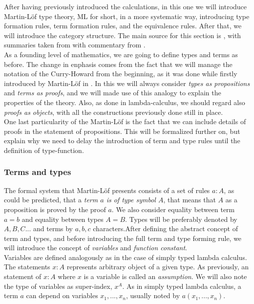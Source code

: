 After having previously introduced the calculations, in this one we will introduce Martin-L\"of type theory, ML for short, in a more systematic way, introducing type formation rules, term formation rules, and the equivalence rules. After that, we will introduce the category structure. The main source for this section is \cite{martinlof1973intuitionistic}, with summaries taken from \cite{seely1984locally} with commentary from .\\

As a founding level of mathematics, we are going to define types and terms as before. The change in enphasis comes from the fact that we will manage the notation of the Curry-Howard from the beginning, as it was done while firstly introduced by Martin-L\"of in \cite{martinlof1973intuitionistic}. In this we will always consider \emph{types as propositions} and \emph{terms as proofs}, and we will made use of this analogy to explain the properties of the theory. Also, as done in lambda-calculus, we should regard also \emph{proofs as objects}, with all the constructions previously done still in place.\\

One last particularity of the Martin-L\"of is the fact that we can include details of proofs in the statement of propositions. This will be formalized further on, but explain why we need to delay the introduction of term and type rules until the definition of type-function.

\subsubsection{Terms and types}

The formal system that Martin-L\"of presents consists of a set of rules $a : A$, as could be predicted, that a \emph{term $a$ is of type symbol $A$}, that means that $A$ as a proposition is proved by the proof $a$. We also consider equality between term $a = b$ and equality between types $A = B$. Types will be preferably denoted by $A,B,C...$ and terms by $a,b,c$ characters.After defining the abstract concept of term and types, and before introducing the full term and type forming rule, we will introduce the concept of \emph{variables} and \emph{function constant}.\\

Variables are defined analogously as in the case of simply typed lambda calculus. The statements $x: A$ represents arbitrary object of a given type. As previously, an statement of $x: A$ where $x$ is a variable is called an \emph{assumption}. We will also note the type of variables as super-index, $x^A$. As in simply typed lambda calculus, a term $a$ can depend on variables $x_1,...,x_n$, usually noted by $a(x_1,...,x_n)$.\\

